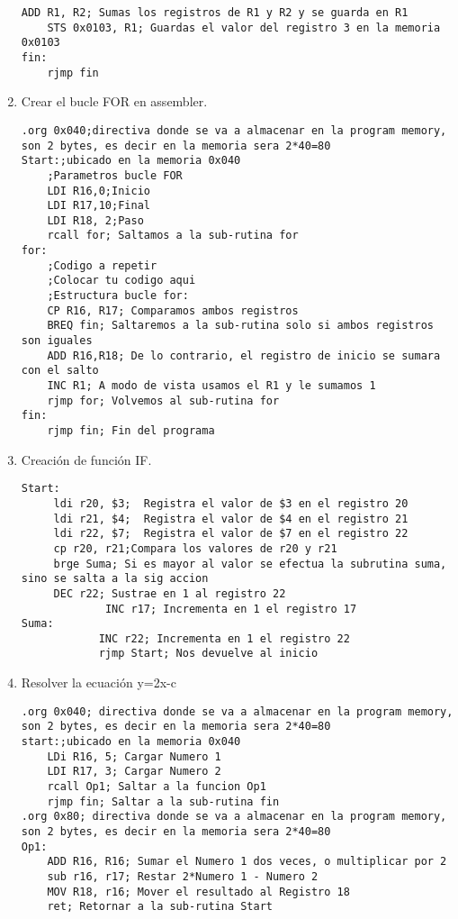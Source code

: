 \documentclass[
	12pt, %
	fleqn, %
	a4paper, %
]{LegrandOrangeBook}
\begin{document}
\begin{enumerate}
\begin{lstlisting}[language={[x86masm]Assembler},frame=single,caption={Movimiento de datos en la SRAM},captionpos=b,numbers=none]
	ADD R1, R2; Sumas los registros de R1 y R2 y se guarda en R1
	STS 0x0103, R1; Guardas el valor del registro 3 en la memoria 0x0103
fin:
	rjmp fin
\end{lstlisting}
\item Crear el bucle FOR en assembler.
\begin{lstlisting}[language={[x86masm]Assembler},frame=single,caption={Bucle for en Assembler},captionpos=b,numbers=none]
.org 0x040;directiva donde se va a almacenar en la program memory, son 2 bytes, es decir en la memoria sera 2*40=80
Start:;ubicado en la memoria 0x040
	;Parametros bucle FOR
	LDI R16,0;Inicio
	LDI R17,10;Final
	LDI R18, 2;Paso
	rcall for; Saltamos a la sub-rutina for
for:
	;Codigo a repetir
	;Colocar tu codigo aqui
	;Estructura bucle for:
	CP R16, R17; Comparamos ambos registros
	BREQ fin; Saltaremos a la sub-rutina solo si ambos registros son iguales
	ADD R16,R18; De lo contrario, el registro de inicio se sumara con el salto
	INC R1; A modo de vista usamos el R1 y le sumamos 1
	rjmp for; Volvemos al sub-rutina for
fin:
	rjmp fin; Fin del programa
\end{lstlisting}
\item Creación de función IF.
\begin{lstlisting}[language={[x86masm]Assembler},frame=single,caption={Comparación con ``if''},captionpos=b,numbers=none]
Start:
	 ldi r20, $3;  Registra el valor de $3 en el registro 20
	 ldi r21, $4;  Registra el valor de $4 en el registro 21
	 ldi r22, $7;  Registra el valor de $7 en el registro 22
	 cp r20, r21;Compara los valores de r20 y r21
	 brge Suma; Si es mayor al valor se efectua la subrutina suma, sino se salta a la sig accion
	 DEC r22; Sustrae en 1 al registro 22
             INC r17; Incrementa en 1 el registro 17
Suma:
            INC r22; Incrementa en 1 el registro 22
            rjmp Start; Nos devuelve al inicio
\end{lstlisting}
\item Resolver la ecuación y=2x-c
\begin{lstlisting}[language={[x86masm]Assembler},frame=single,caption={Resolución de ecuación lineal},captionpos=b,numbers=none]
.org 0x040; directiva donde se va a almacenar en la program memory, son 2 bytes, es decir en la memoria sera 2*40=80
start:;ubicado en la memoria 0x040
	LDi R16, 5; Cargar Numero 1
	LDI R17, 3; Cargar Numero 2
	rcall Op1; Saltar a la funcion Op1
	rjmp fin; Saltar a la sub-rutina fin
.org 0x80; directiva donde se va a almacenar en la program memory, son 2 bytes, es decir en la memoria sera 2*40=80
Op1:
	ADD R16, R16; Sumar el Numero 1 dos veces, o multiplicar por 2
	sub r16, r17; Restar 2*Numero 1 - Numero 2
	MOV R18, r16; Mover el resultado al Registro 18
	ret; Retornar a la sub-rutina Start


\end{lstlisting}
\end{enumerate}
\end{document}

